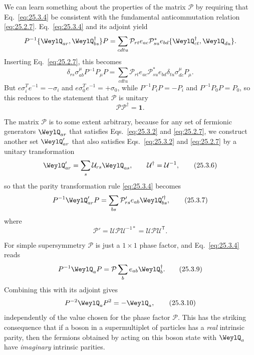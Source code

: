 We can learn something about the properties of the matrix \(\mathcal P\) by
requiring that\linebreak
Eq.~\eqref{eq:25.3.4} be consistent with the fundamental
anticommutation relation \eqref{eq:25.2.7}.\linebreak
Eq.~\eqref{eq:25.3.4} and its adjoint yield
\[
P^{-1}\{\WeylQ_{ar},\WeylQ_{bs}^{\dagger}\}P
=\sum_{cdtu}\mathcal P_{rt}e_{ac}\mathcal P_{su}^{*}e_{bd}
\{\WeylQ_{ct}^{\dagger},\WeylQ_{du}\}.
\]
Inserting Eq.~\eqref{eq:25.2.7}, this becomes
\[
\delta_{rs}\sigma^\mu_{ab}P^{-1}P_\mu P
=\sum_{cdtu}\mathcal P_{rt}e_{ac}\mathcal P_{su}^{*}e_{bd}
\delta_{tu}\sigma^\mu_{dc}P_\mu.
\]
But \(e\sigma_i^Te^{-1}=-\sigma_i\) and
\(e\sigma_0^Te^{-1}=+\sigma_0\), while \(P^{-1}P_iP=-P_i\) and
\(P^{-1}P_0P=P_0\), so this reduces to the statement that \(\mathcal P\) is
unitary
\begin{equation}
\mathcal P\mathcal P^\dagger=\mathbf{1}.
\tag{25.3.5}\label{eq:25.3.5}
\end{equation}

The matrix \(\mathcal P\) is to some extent arbitrary, because for any set of
fermionic generators \(\WeylQ_{ar}\) that satisfies Eqs.~\eqref{eq:25.3.2}
and \eqref{eq:25.2.7}, we construct another set \(\WeylQ'_{ar}\) that also
satisfies Eqs.~\eqref{eq:25.3.2} and \eqref{eq:25.2.7} by a unitary
transformation
\begin{equation}
\WeylQ'_{ar}=\sum_s\mathcal U_{rs}\WeylQ_{as},
\qquad
\mathcal U^\dagger=\mathcal U^{-1},
\tag{25.3.6}\label{eq:25.3.6}
\end{equation}
so that the parity transformation rule \eqref{eq:25.3.4} becomes
\begin{equation}
P^{-1}\WeylQ'_{ar}P
=\sum_{bs}\mathcal P'_{rs}e_{ab}\WeylQ_{bs}^{\prime\dagger},
\tag{25.3.7}\label{eq:25.3.7}
\end{equation}
where
\begin{equation}
\mathcal P'=\mathcal U\mathcal P\mathcal U^{-1*}
=\mathcal U\mathcal P\mathcal U^{\mathsf T}.
\tag{25.3.8}\label{eq:25.3.8}
\end{equation}

For simple supersymmetry \(\mathcal P\) is just a \(1\times1\) phase factor,
and Eq.~\eqref{eq:25.3.4} reads
\begin{equation}
P^{-1}\WeylQ_aP
=\mathcal P\sum_b e_{ab}\WeylQ_b^\dagger.
\tag{25.3.9}\label{eq:25.3.9}
\end{equation}
Combining this with its adjoint gives
\begin{equation}
P^{-2}\WeylQ_aP^2=-\WeylQ_a,
\tag{25.3.10}\label{eq:25.3.10}
\end{equation}
independently of the value chosen for the phase factor \(\mathcal P\). This
has the striking consequence that if a boson in a supermultiplet of
particles has a \emph{real} intrinsic parity, then the fermions obtained by
acting on this boson state with \(\WeylQ_a\) have \emph{imaginary} intrinsic
parities.


